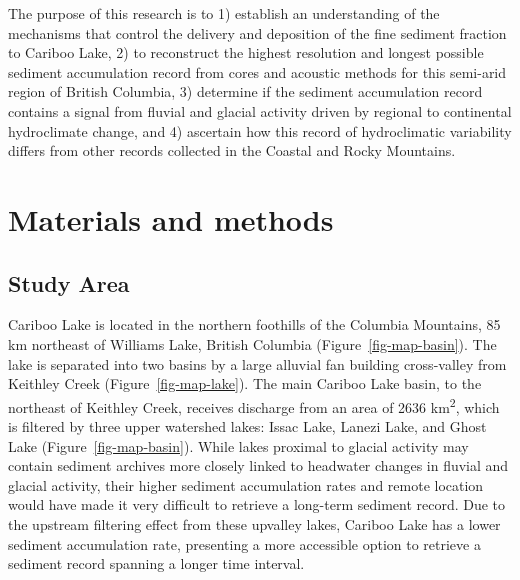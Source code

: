 \documentclass[
  letterpaper,
  DIV=11,
  numbers=noendperiod]{scrartcl}
\begin{document}
The purpose of this research is to 1) establish an understanding of the
mechanisms that control the delivery and deposition of the fine sediment
fraction to Cariboo Lake, 2) to reconstruct the highest resolution and
longest possible sediment accumulation record from cores and acoustic
methods for this semi-arid region of British Columbia, 3) determine if
the sediment accumulation record contains a signal from fluvial and
glacial activity driven by regional to continental hydroclimate change,
and 4) ascertain how this record of hydroclimatic variability differs
from other records collected in the Coastal and Rocky Mountains.

\section{Materials and methods}\label{materials-and-methods}

\subsection{Study Area}\label{study-area}

Cariboo Lake is located in the northern foothills of the Columbia
Mountains, 85 km northeast of Williams Lake, British Columbia
(Figure~\ref{fig-map-basin}). The lake is separated into two basins by a
large alluvial fan building cross-valley from Keithley Creek
(Figure~\ref{fig-map-lake}). The main Cariboo Lake basin, to the
northeast of Keithley Creek, receives discharge from an area of 2636
km\textsuperscript{2}, which is filtered by three upper watershed lakes:
Issac Lake, Lanezi Lake, and Ghost Lake (Figure~\ref{fig-map-basin}).
While lakes proximal to glacial activity may contain sediment archives
more closely linked to headwater changes in fluvial and glacial
activity, their higher sediment accumulation rates and remote location
would have made it very difficult to retrieve a long-term sediment
record. Due to the upstream filtering effect from these upvalley lakes,
Cariboo Lake has a lower sediment accumulation rate, presenting a more
accessible option to retrieve a sediment record spanning a longer time
interval.
\end{document}
